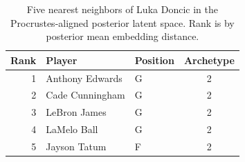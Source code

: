 \begin{table}[htbp]
  \centering\small
  \begin{tabular}{rllc}
    \toprule
    Rank & Player & Position & Archetype \\
    \midrule
    1 & Anthony Edwards & G & 2 \\
    2 & Cade Cunningham & G & 2 \\
    3 & LeBron James & G & 2 \\
    4 & LaMelo Ball & G & 2 \\
    5 & Jayson Tatum & F & 2 \\
    \bottomrule
  \end{tabular}
  \caption{Five nearest neighbors of Luka Doncic in the Procrustes-aligned posterior latent space. Rank is by posterior mean embedding distance.}
  \label{tab:Luka_Doncic_neighbors}
\end{table}

